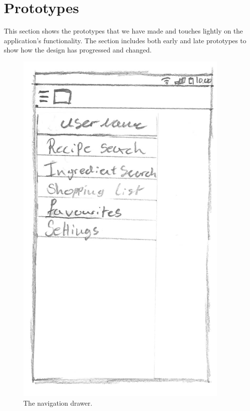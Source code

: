 \section{Prototypes}\label{sec:prototypes}
This section shows the prototypes that we have made and touches lightly on the application's functionality. The section includes both early and late prototypes to show how the design has progressed and changed. 

\begin{figure}[H]
\begin{minipage}[b]{0.5\columnwidth}
\centering
\includegraphics[width=0.7\columnwidth]{img/prototypes/navigation_drawer.pdf}
\caption{The navigation drawer\label{fig:navdrawer}.}
\end{minipage}
\hspace{0.5cm}
\begin{minipage}[b]{0.5\columnwidth}
\centering

\end{minipage}
\end{figure}
